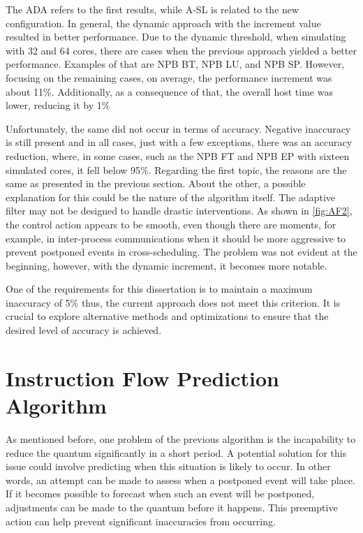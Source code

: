 The ADA refers to the first results, while A-SL is related to the new configuration. In general, the dynamic approach with the 
increment value resulted in better performance. Due to the dynamic threshold, when simulating with 32 and 64 cores, there are cases when the
previous approach yielded a better performance. Examples of that are NPB BT, NPB LU, and NPB SP. However, focusing on the remaining cases, 
on average, the performance increment was about 11\%. Additionally, as a consequence of that, the overall host 
time was lower, reducing it by 1\%

Unfortunately, the same did not occur in terms of accuracy. Negative inaccuracy is still present and in all cases, just with a few exceptions, 
there was an accuracy reduction, where, in some cases, such as the NPB FT and NPB EP with sixteen simulated cores, it fell below 95\%. 
Regarding the first topic, the reasons are the same as presented in the previous section. About the other,  
a possible explanation for this could be the nature of the algorithm itself. The adaptive filter may not be designed to 
handle drastic interventions. As shown in \autoref{fig:AF2}, the control action appears to be smooth, even though there are moments, for example, 
in inter-process communications when it should be more aggressive to prevent postponed events in cross-scheduling. The problem was not evident at 
the beginning, however, with the dynamic increment, it becomes more notable. 

One of the requirements for this dissertation is to maintain a maximum inaccuracy of 5\% thus, the current approach does not meet this criterion. 
It is crucial to explore alternative methods and optimizations to ensure that the desired level of accuracy is achieved.

\section{Instruction Flow Prediction Algorithm}

As mentioned before, one problem of the previous algorithm is the incapability to reduce the quantum significantly in a short period. A potential 
solution for this issue could involve predicting when this situation is likely to occur. In other words, an attempt can be made to assess when a 
postponed event will take place. If it becomes possible to forecast when such an event will be postponed, adjustments can be made to the quantum 
before it happens. This preemptive action can help prevent significant inaccuracies from occurring. 

